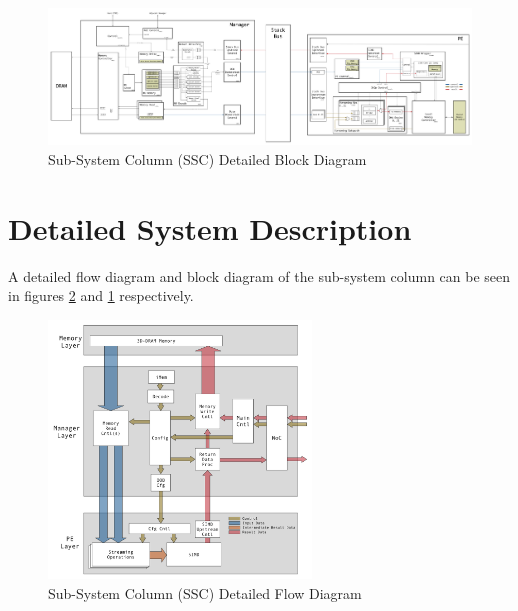 \documentclass[journal]{IEEEtran}
\begin{document}
\begin{figure}[!t]
\centering
\captionsetup{justification=centering}
\centerline{
\mbox{\includegraphics[width=6.0in]{DetailedBlockDiagram.jpg}}
}
\center\caption{Sub-System Column (SSC) Detailed Block Diagram}
\label{fig:DetailedBlockDiagram}
\end{figure}

\fi

\iffalse


\section{Detailed System Description}
\label{sec:detailedSystemDescription}

A detailed flow diagram and block diagram of the sub-system column can be seen in figures \ref{fig:DetailedFlowDiagram} and \ref{fig:DetailedBlockDiagram} respectively.
\begin{figure}[!t]
\centering
\captionsetup{justification=centering}
\captionsetup{width=.9\linewidth}
\centerline{
\mbox{\includegraphics[width=2.75in]{DetailedFlowDiagram.jpg}}
}
\center\caption{Sub-System Column (SSC) Detailed Flow Diagram}
\label{fig:DetailedFlowDiagram}
\end{figure}
\end{document}
